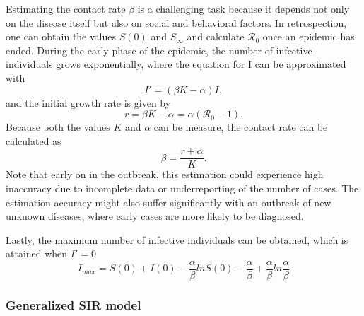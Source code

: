 Estimating the contact rate $\beta$ is a challenging task because it depends not only on the disease itself but also on social and behavioral factors.
In retrospection, one can obtain the values $S(0)$ and $S_\infty$ and calculate $\mathcal{R}_0$ once an epidemic has ended.
During the early phase of the epidemic, the number of infective individuals grows exponentially, where the equation for I can be approximated with \cite{brauerCompartmentalModelsEpidemiology2008}
\begin{equation}
    I' = (\beta K - \alpha) I,
\end{equation}
and the initial growth rate is given by
\begin{equation}
    r = \beta K - \alpha = \alpha (\mathcal{R}_0 - 1).
\end{equation}
Because both the values $K$ and $\alpha$ can be measure, the contact rate can be calculated as \cite{brauerCompartmentalModelsEpidemiology2008}
\begin{equation}
    \beta = \frac{r + \alpha}{K}.
\end{equation}
Note that early on in the outbreak, this estimation could experience high inaccuracy due to incomplete data or underreporting of the number of cases.
The estimation accuracy might also suffer significantly with an outbreak of new unknown diseases, where early cases are more likely to be diagnosed.

Lastly, the maximum number of infective individuals can be obtained, which is attained when $I' = 0$ \cite{brauerCompartmentalModelsEpidemiology2008}
\begin{equation}
    I_{max} = S(0) + I(0) - \frac{\alpha}{\beta} ln S(0) - \frac{\alpha}{\beta} + \frac{\alpha}{\beta} ln \frac{\alpha}{\beta}
\end{equation}

\subsubsection{Generalized SIR model}
\label{sec:literature-review-generalized-sir-model}

